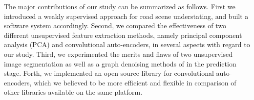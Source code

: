 The major contributions of our study can be summarized as follows. First we introduced a weakly supervised approach for road scene understating, and built a software system accordingly. Second, we compared the effectiveness of two different unsupervised feature extraction methods, namely principal component analysis (PCA) and convolutional auto-encoders, in several aspects with regard to our study. Third, we experimented the merits and flaws of two unsupervised image segmentation as well as a graph denoising methods of in the prediction stage. Forth, we implemented an open source library for convolutional auto-encoders, which we believed to be more efficient and flexible in comparison of other libraries available on the same platform.


